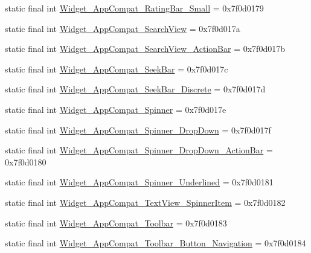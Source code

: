 \begin{DoxyCompactItemize}
static final int \mbox{\hyperlink{classandroid_1_1support_1_1design_1_1R_1_1style_a0b118a854e0340226bcc8e52777c1d2f}{Widget\+\_\+\+App\+Compat\+\_\+\+Rating\+Bar\+\_\+\+Small}} = 0x7f0d0179
\item 
static final int \mbox{\hyperlink{classandroid_1_1support_1_1design_1_1R_1_1style_af6d560de565321d15b4a69965fafa406}{Widget\+\_\+\+App\+Compat\+\_\+\+Search\+View}} = 0x7f0d017a
\item 
static final int \mbox{\hyperlink{classandroid_1_1support_1_1design_1_1R_1_1style_a2aa0a46a64702cbdf9aaa8e3429ab0ec}{Widget\+\_\+\+App\+Compat\+\_\+\+Search\+View\+\_\+\+Action\+Bar}} = 0x7f0d017b
\item 
static final int \mbox{\hyperlink{classandroid_1_1support_1_1design_1_1R_1_1style_ae54f68dd3e90f4e8ff9136275712c095}{Widget\+\_\+\+App\+Compat\+\_\+\+Seek\+Bar}} = 0x7f0d017c
\item 
static final int \mbox{\hyperlink{classandroid_1_1support_1_1design_1_1R_1_1style_afc2e13a950726a10343b942eb0c881f9}{Widget\+\_\+\+App\+Compat\+\_\+\+Seek\+Bar\+\_\+\+Discrete}} = 0x7f0d017d
\item 
static final int \mbox{\hyperlink{classandroid_1_1support_1_1design_1_1R_1_1style_a4789d9d51f1b1f6f79df9813c334b06c}{Widget\+\_\+\+App\+Compat\+\_\+\+Spinner}} = 0x7f0d017e
\item 
static final int \mbox{\hyperlink{classandroid_1_1support_1_1design_1_1R_1_1style_a9bff6276c861e1b86ed15d178ebb319f}{Widget\+\_\+\+App\+Compat\+\_\+\+Spinner\+\_\+\+Drop\+Down}} = 0x7f0d017f
\item 
static final int \mbox{\hyperlink{classandroid_1_1support_1_1design_1_1R_1_1style_ac9a5e8337a2d3ae56a72aff0816041ee}{Widget\+\_\+\+App\+Compat\+\_\+\+Spinner\+\_\+\+Drop\+Down\+\_\+\+Action\+Bar}} = 0x7f0d0180
\item 
static final int \mbox{\hyperlink{classandroid_1_1support_1_1design_1_1R_1_1style_acef1f548c2829a2ec8d901c69e71a2e8}{Widget\+\_\+\+App\+Compat\+\_\+\+Spinner\+\_\+\+Underlined}} = 0x7f0d0181
\item 
static final int \mbox{\hyperlink{classandroid_1_1support_1_1design_1_1R_1_1style_a312f7d2acedfe37ba69323b72be9ac8f}{Widget\+\_\+\+App\+Compat\+\_\+\+Text\+View\+\_\+\+Spinner\+Item}} = 0x7f0d0182
\item 
static final int \mbox{\hyperlink{classandroid_1_1support_1_1design_1_1R_1_1style_acf5c2e90e5ec401cf8befb6708bdfe1b}{Widget\+\_\+\+App\+Compat\+\_\+\+Toolbar}} = 0x7f0d0183
\item 
static final int \mbox{\hyperlink{classandroid_1_1support_1_1design_1_1R_1_1style_a6f721ee1613805b7fdb270545f575576}{Widget\+\_\+\+App\+Compat\+\_\+\+Toolbar\+\_\+\+Button\+\_\+\+Navigation}} = 0x7f0d0184

\end{DoxyCompactItemize}
